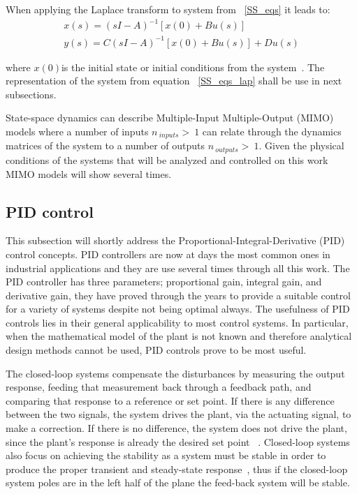  When applying the Laplace transform to system from ~\ref{SS_eqs} it leads to:
 \begin{align}
 	x(s)=(sI-A)^{-1}[x(0)+Bu(s)]\\
 	y(s)=C(sI-A)^{-1}[x(0)+Bu(s)]+Du(s)
 	\label{SS_eqs_lap}
 \end{align}
 
 where $x(0) $is the initial state or initial conditions from the system~\cite[Chapter ~4]{Chen1999}. The representation of the system from equation ~\ref{SS_eqs_lap} shall be use in next subsections.\smallskip
 
State-space dynamics can describe Multiple-Input Multiple-Output (MIMO) models where a number of inputs $n_{~inputs}>~1$ can relate through the dynamics  matrices of the system to a number of outputs $n_{~outputs}>~1$. Given the physical conditions of the systems that will be analyzed and controlled on this work MIMO models will show several times.


\subsection{PID control}
\label{PID_sec}
This subsection will shortly address the Proportional-Integral-Derivative (PID) control  concepts. PID controllers are now at days the most common ones in industrial applications and they are use several times through all this work. The PID controller has three parameters; proportional gain, integral gain, and derivative gain, they have proved through the years to provide a suitable control for a variety of systems despite not being optimal always. The usefulness of PID controls lies in their general applicability to most control systems. In particular, when the mathematical model of the plant is not known and therefore analytical design methods cannot be used, PID controls prove to be most useful.  
\smallskip

The closed-loop systems compensate the disturbances by measuring the output
response, feeding that measurement back through a feedback path, and comparing
that response to a reference or set point. If there is any difference between
the two signals, the system drives the plant, via the actuating signal, to make a
correction. If there is no difference, the system does not drive the plant, since the
plant’s response is already the desired set point ~\cite[Chapter ~1]{Nise}. Closed-loop systems also focus on achieving the stability as a system must be stable in order to produce the proper transient and steady-state response~\cite[Chapter ~3]{Nise}, thus if the closed-loop system poles are in the left half of the plane the feed-back system will be stable.
\smallskip

